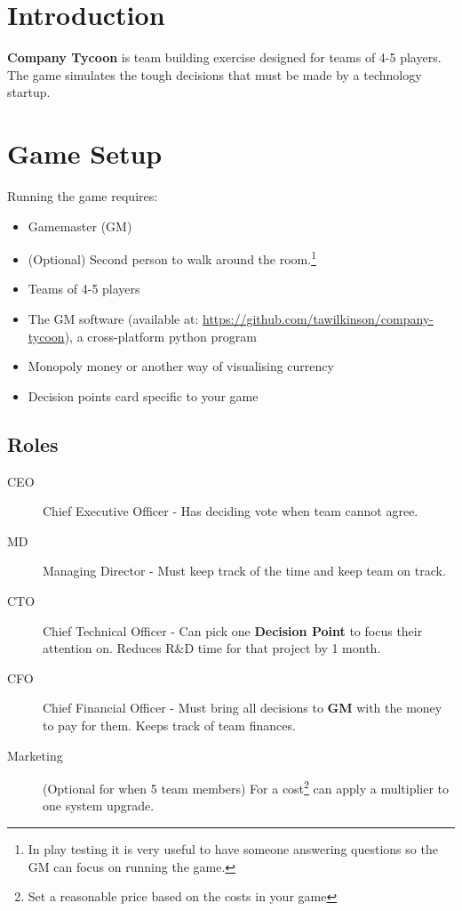 \documentclass[a4paper]{article}
\begin{document}
\section{Introduction}
\textbf{Company Tycoon} is team building exercise designed for teams of 4-5 players. The game simulates the tough decisions that must be made by a technology startup.

\section{Game Setup}
Running the game requires:

\begin{itemize}
    \item Gamemaster (GM)
    \item (Optional) Second person to walk around the room.\footnote{In play testing it is very useful to have someone answering questions so the GM can focus on running the game.} 
    \item Teams of 4-5 players
    \item The GM software (available at: \href{https://github.com/tawilkinson/company-tycoon}{https://github.com/tawilkinson/company-tycoon}), a cross-platform python program
    \item Monopoly money or another way of visualising currency
    \item Decision points card specific to your game
\end{itemize}

\subsection{Roles}

\begin{description}
    \item [CEO] Chief Executive Officer - Has deciding vote when team cannot agree.
    \item [MD] Managing Director - Must keep track of the time and keep team on track.
    \item [CTO] Chief Technical Officer - Can pick one \textbf{Decision Point} to focus their attention on. Reduces R\&D time for that project by 1 month.
    \item [CFO] Chief Financial Officer - Must bring all decisions to \textbf{GM} with the money to pay for them. Keeps track of team finances.
    \item [Marketing] (Optional for when 5 team members) For a cost\footnote{Set a reasonable price based on the costs in your game} can apply a multiplier to one system upgrade.
\end{description}
\end{document}
